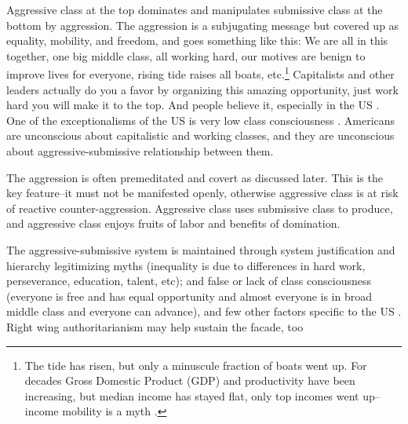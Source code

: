 \documentclass[11pt, letterpaper]{article}
\begin{document}
\begin{spacing}{2.0}
 Aggressive class at the top  dominates and manipulates submissive class at the bottom
 by aggression. The aggression is a subjugating message but covered up as equality, mobility, and freedom, and goes something like this:
 We are all in this together, one big middle class, all working hard, our motives are benign to
 improve lives for everyone, rising tide raises all boats, etc.\footnote{The tide has risen, but only a minuscule fraction of boats went up. For decades
 Gross Domestic Product (GDP) and productivity have been increasing, but median income
 has stayed flat, only top incomes went up--income mobility is a myth \citep{corak13,corak11,corak04}.
}
 Capitalists and other leaders actually do you a favor by organizing this amazing
 opportunity, just work hard you will make it to the top. And people believe it,
 especially in the US \cite{aokditella}.  %
  One of the
 exceptionalisms of the US is very low class consciousness
  \citep{lipset97, lipset00}. Americans are unconscious about capitalistic and
  working classes, and they are unconscious about aggressive-submissive
  relationship between them.
 
The aggression is often premeditated and
covert as discussed later. This is the key
 feature--it must not be manifested openly, otherwise aggressive class is at
 risk of reactive counter-aggression. 
 Aggressive class uses submissive class to produce, and aggressive class enjoys
 fruits of labor and benefits of domination.

 

The aggressive-submissive system is maintained through system
justification \citep{jost94, jost04} and hierarchy legitimizing
 myths \citep{pratto94, pratto06} (inequality is due to differences in hard
 work, perseverance, education, talent, etc); and false or lack of class
 consciousness \citep{marx10,marx12} (everyone is free and has equal opportunity and almost everyone is in broad middle class and everyone can advance),
  and few other factors specific to the US \citep{lipset97, lipset00}.
 Right wing authoritarianism may help sustain the facade, too  \citep{altemeyer98}






\end{spacing}
\end{document}
